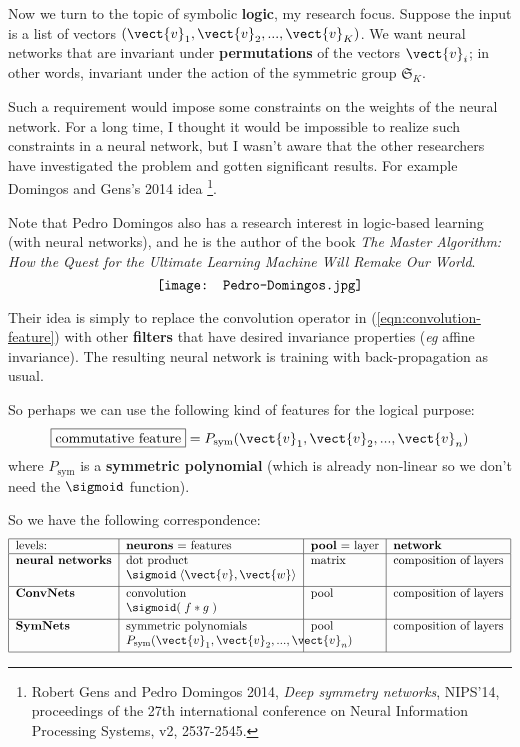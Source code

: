Now we turn to the topic of symbolic \textbf{logic}, my research focus.  Suppose the input is a list of vectors $(\vect{v}_1, \vect{v}_2, ... , \vect{v}_K)$.  We want neural networks that are invariant under \textbf{permutations} of the vectors $\vect{v}_i$; in other words, invariant under the action of the symmetric group $\mathfrak{S}_K$.

Such a requirement would impose some constraints on the weights of the neural network.  For a long time, I thought it would be impossible to realize such constraints in a neural network, but I wasn't aware that the other researchers have investigated the problem and gotten significant results.  For example Domingos and Gens's 2014 idea
\footnote{Robert Gens and Pedro Domingos 2014, \textit{Deep symmetry networks}, NIPS'14, proceedings of the 27th international conference on Neural Information Processing Systems, v2, 2537-2545.}.

Note that Pedro Domingos also has a research interest in logic-based learning (with neural networks), and he is the author of the book \textit{The Master Algorithm: How the Quest for the Ultimate Learning Machine Will Remake Our World}.
\begin{equation}
\nonumber
\vcenter{\hbox{\texttt{[image: Pedro-Domingos.jpg]}}}
\end{equation}

Their idea is simply to replace the convolution operator in (\ref{eqn:convolution-feature}) with other \textbf{filters} that have desired invariance properties (\textit{eg} affine invariance).  The resulting neural network is training with back-propagation as usual.

So perhaps we can use the following kind of features for the logical purpose:
\begin{equation}
\label{eqn:commutative-feature}
\boxed{\mbox{commutative feature}} = P_{\mathrm{sym}} (\vect{v}_1, \vect{v}_2, ..., \vect{v}_n)
\end{equation}
where $P_{\mathrm{sym}}$ is a \textbf{symmetric polynomial} (which is already non-linear so we don't need the $\sigmoid$ function).

So we have the following correspondence:
\begin{equation}
\begin{tabular}{|l|l|l|l|}
	\hline
	levels: & \textbf{neurons} = features & \textbf{pool} = layer & \textbf{network} \\
	\hline
	\textbf{neural networks} & \parbox[t]{5cm}{dot product \\ $\sigmoid \; \langle \vect{v}, \vect{w} \rangle$ } & matrix & composition of layers \\[1.5em]
	\hline
	\textbf{ConvNets} & \parbox[t]{5cm}{convolution \\ $\sigmoid( \; f * g \; )$ } & pool & composition of layers \\[1.5em]
	\hline
	\textbf{SymNets} & \parbox[t]{5cm}{symmetric polynomials \\ $P_{\mathrm{sym}} (\vect{v}_1, \vect{v}_2, ..., \vect{v}_n)$ } & pool & composition of layers \\[1.5em]
	\hline
\end{tabular}
\end{equation}

